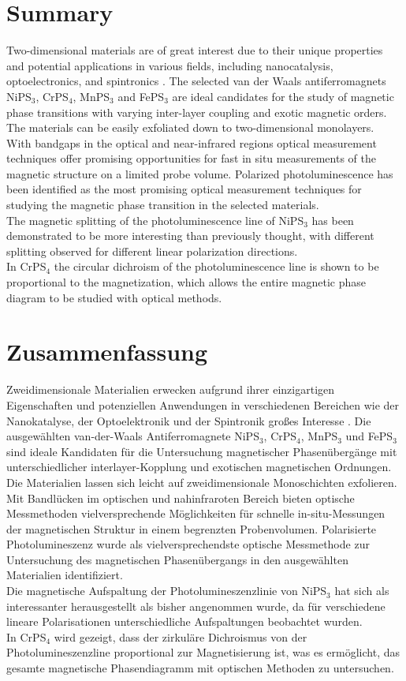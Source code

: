 \documentclass[
	oneside,
	parskip=half,
	a4paper,
]{scrbook}
\begin{document}
\section*{Summary}
Two-dimensional materials are of great interest due to their unique properties and potential applications in various fields, including nanocatalysis, optoelectronics, and spintronics \cite{MPX_review}. 
The selected van der Waals antiferromagnets NiPS$_3$, CrPS$_4$, MnPS$_3$ and FePS$_3$ are ideal candidates for the study of magnetic phase transitions with varying inter-layer coupling and exotic magnetic orders.
The materials can be easily exfoliated down to two-dimensional monolayers.\\
With bandgaps in the optical and near-infrared regions optical measurement techniques offer promising opportunities for fast in situ measurements of the magnetic structure on a limited probe volume.
Polarized photoluminescence has been identified as the most promising optical measurement techniques for studying the magnetic phase transition in the selected materials.\\
The magnetic splitting of the photoluminescence line of NiPS$_3$ has been demonstrated to be more interesting than previously thought, with different splitting observed for different linear polarization directions.\\
In CrPS$_4$ the circular dichroism of the photoluminescence line is shown to be proportional to the magnetization, which allows the entire magnetic phase diagram to be studied with optical methods.

\vfill
\section*{Zusammenfassung}
Zweidimensionale Materialien erwecken aufgrund ihrer einzigartigen Eigenschaften und potenziellen Anwendungen in verschiedenen Bereichen wie der Nanokatalyse, der Optoelektronik und der Spintronik großes Interesse \cite{MPX_review}.
Die ausgewählten van-der-Waals Antiferromagnete NiPS$_3$, CrPS$_4$, MnPS$_3$ und FePS$_3$ sind ideale Kandidaten für die Untersuchung magnetischer Phasenübergänge mit unterschiedlicher interlayer-Kopplung und exotischen magnetischen Ordnungen.
Die Materialien lassen sich leicht auf zweidimensionale Monoschichten exfolieren.\\
Mit Bandlücken im optischen und nahinfraroten Bereich bieten optische Messmethoden vielversprechende Möglichkeiten für schnelle in-situ-Messungen der magnetischen Struktur in einem begrenzten Probenvolumen. 
Polarisierte Photolumineszenz wurde als vielversprechendste optische Messmethode zur Untersuchung des magnetischen Phasenübergangs in den ausgewählten Materialien identifiziert.\\
Die magnetische Aufspaltung der Photolumineszenzlinie von NiPS$_3$ hat sich als interessanter herausgestellt als bisher angenommen wurde, da für verschiedene lineare Polarisationen unterschiedliche Aufspaltungen beobachtet wurden.\\
In CrPS$_4$ wird gezeigt, dass der zirkuläre Dichroismus von der Photolumineszenzline proportional zur Magnetisierung ist, was es ermöglicht, das gesamte magnetische Phasendiagramm mit optischen Methoden zu untersuchen.
\end{document}
